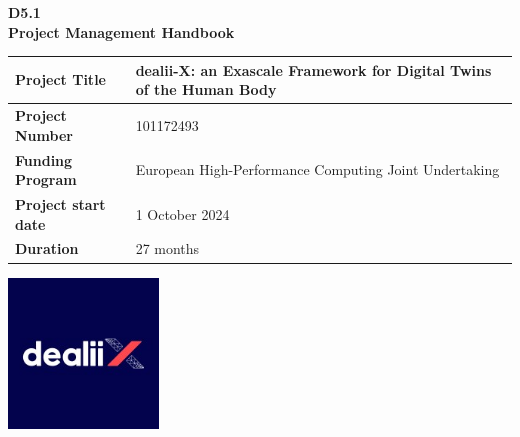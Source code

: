 \documentclass[a4paper,12pt]{article}
\begin{document}
\begin{titlepage}
    \centering
    \vspace*{2cm}

    \Huge
    \textbf{\textcolor{EUblue}{D5.1\\Project Management Handbook}}

    \vspace{0.5cm}
    \LARGE

    \vspace{2cm}
  \begin{table}[h!]
    \renewcommand{\arraystretch}{1.5} %
    \setlength{\tabcolsep}{10pt}      %
    \raggedright
    \begin{tabular}{|p{5cm}|p{10cm}|}
        \hline
        \textbf{Project Title} & dealii-X: an Exascale Framework for Digital Twins of the Human Body \\ \hline
        \textbf{Project Number} & 101172493 \\ \hline
        \textbf{Funding Program} & European High-Performance Computing Joint Undertaking \\ 
        \hline
        \textbf{Project start date} & 1 October 2024 \\ 
        \hline
        \textbf{Duration} & 27 months \\ 
        \hline
    \end{tabular}
\end{table}
    
    \centering

    \vspace{2cm}

    \includegraphics[width=0.3\textwidth]{logos/dealii-x_logo.jpeg} %


\end{titlepage}
\end{document}
